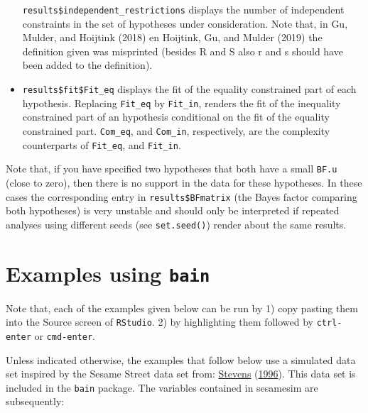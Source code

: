 \documentclass[
]{book}
\begin{document}
\begin{itemize}
  \texttt{results\$independent\_restrictions} displays the number of
  independent constraints in the set of hypotheses under consideration. Note that,
  in Gu, Mulder, and Hoijtink (2018) en Hoijtink, Gu, and Mulder (2019) the
  definition given was misprinted (besides R and S also r and s should have been
  added to the definition).
\item
  \texttt{results\$fit\$Fit\_eq} displays the fit of the equality constrained
  part of each hypothesis. Replacing \texttt{Fit\_eq} by \texttt{Fit\_in}, renders
  the fit of the inequality constrained part of an hypothesis conditional on
  the fit of the equality constrained part. \texttt{Com\_eq}, and \texttt{Com\_in},
  respectively, are the complexity counterparts of \texttt{Fit\_eq}, and
  \texttt{Fit\_in}.
\end{itemize}

Note that, if you have specified two hypotheses that both have a small
\texttt{BF.u} (close to zero), then there is no support in the data for these
hypotheses. In these cases the corresponding entry in \texttt{results\$BFmatrix}
(the Bayes factor comparing both hypotheses) is very unstable and should
only be interpreted if repeated analyses using different seeds
(see \texttt{set.seed()}) render about the same results.

\hypertarget{examples-using-bain}{%
\chapter{\texorpdfstring{Examples using \texttt{bain}}{Examples using bain}}\label{examples-using-bain}}

Note that, each of the examples given below can be run by
1) copy pasting them into the Source screen of \texttt{RStudio}.
2) by highlighting them followed by \texttt{ctrl-enter} or \texttt{cmd-enter}.

Unless indicated otherwise, the examples that follow below use a simulated
data set inspired by the Sesame Street data set from:
\protect\hyperlink{ref-stevens1996applied}{Stevens} (\protect\hyperlink{ref-stevens1996applied}{1996}). This data set is included in the
\texttt{bain} package. The variables contained in sesamesim are subsequently:
\end{document}
